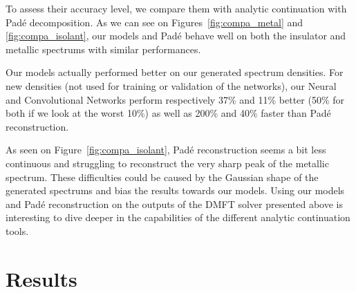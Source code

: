 \documentclass[reprint,amsmath,amssymb,aps,pra]{revtex4-2}
\begin{document}
To assess their accuracy level, we compare them with analytic continuation with Padé decomposition. As we can see on Figures~\ref{fig:compa_metal} and \ref{fig:compa_isolant}, our models and Padé behave well on both the insulator and metallic spectrums with similar performances.

Our models actually performed better on our generated spectrum densities. For new densities (not used for training or validation of the networks), our Neural and Convolutional Networks perform respectively 37\% and 11\% better (50\% for both if we look at the worst 10\%) as well as 200\% and 40\% faster than Padé reconstruction.

As seen on Figure~\ref{fig:compa_isolant}, Padé reconstruction seems a bit less continuous and struggling to reconstruct the very sharp peak of the metallic spectrum. These difficulties could be caused by the Gaussian shape of the generated spectrums and bias the results towards our models. Using our models and Padé reconstruction on the outputs of the DMFT solver presented above is interesting to dive deeper in the capabilities of the different analytic continuation tools.
 
\section{Results}
\end{document}

